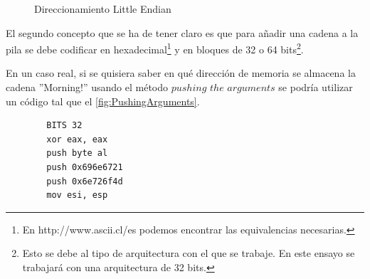 \documentclass [titlepage, 12pt]{article}
\begin{document}
\begin{figure}[!hbp]
	\caption{Direccionamiento Little Endian}
    \label{fig:littleEndian}  
    \centering
    \addtolength{\abovecaptionskip}{-12pt}    
\end{figure}


El segundo concepto que se ha de tener claro es que para a\~nadir una cadena a la pila se debe codificar en hexadecimal\footnote{En http://www.ascii.cl/es podemos encontrar las equivalencias necesarias.} y en bloques de 32 o 64 bits\footnote{Esto se debe al tipo de arquitectura con el que se trabaje. En este ensayo se trabajar\'a con una arquitectura de 32 bits.}. \bigskip

En un caso real, si se quisiera saber en qu\'e direcci\'on de memoria se almacena la cadena ''Morning!'' usando el m\'etodo $pushing$ $the$ $arguments$ se podr\'ia utilizar un c\'odigo tal que el \ref{fig:PushingArguments}.

\lstset{language=[x86masm]Assembler,caption=M\'etodo $Pushing$ $the$ $arguments$,label=fig:PushingArguments}
\begin{lstlisting}
		BITS 32
		xor eax, eax
		push byte al
		push 0x696e6721
		push 0x6e726f4d
		mov esi, esp
\end{lstlisting}
\end{document}
